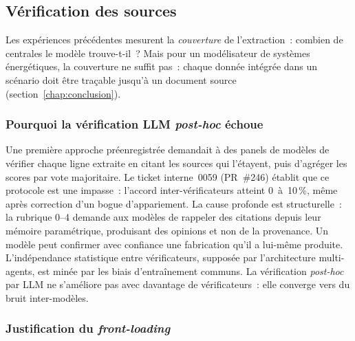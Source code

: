 %

\subsection{Vérification des sources}\label{sec:verification}

Les expériences précédentes mesurent la \emph{couverture} de l'extraction~:
combien de centrales le modèle trouve-t-il~? Mais pour un modélisateur de
systèmes énergétiques, la couverture ne suffit pas~: chaque donnée intégrée
dans un scénario doit être traçable jusqu'à un document source
(section~\ref{chap:conclusion}).

\subsubsection{Pourquoi la vérification LLM \emph{post-hoc} échoue}\label{sec:verif-postHoc}

Une première approche préenregistrée demandait à des panels de modèles de
vérifier chaque ligne extraite en citant les sources qui l'étayent, puis
d'agréger les scores par vote majoritaire. Le ticket interne~0059 (PR~\#246)
établit que ce protocole est une impasse~: l'accord inter-vérificateurs
atteint 0~à~10\,\%, même après correction d'un bogue d'appariement. La
cause profonde est structurelle~: la rubrique 0--4 demande aux modèles de
rappeler des citations depuis leur mémoire paramétrique, produisant des
opinions et non de la provenance. Un modèle peut confirmer avec confiance une
fabrication qu'il a lui-même produite. L'indépendance statistique entre
vérificateurs, supposée par l'architecture multi-agents, est minée par les
biais d'entraînement communs. La vérification \emph{post-hoc} par LLM ne
s'améliore pas avec davantage de vérificateurs~: elle converge vers du bruit
inter-modèles.

\subsubsection{Justification du \emph{front-loading}}\label{sec:verif-frontload}

